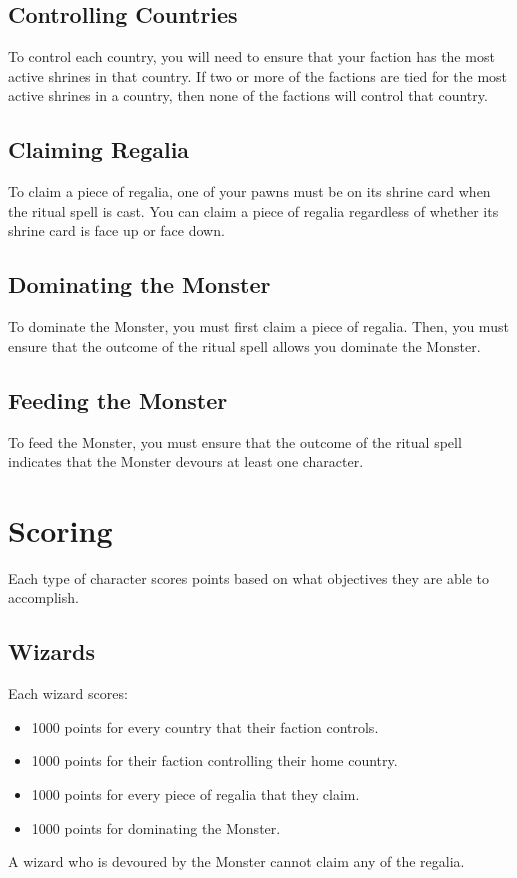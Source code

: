 \documentclass[10pt, parskip=half-, twoside]{scrartcl}
\begin{document}
\subsection*{Controlling Countries}
To control each country, you will need to ensure that your faction has the most active shrines in that country. If two or more of the factions are tied for the most active shrines in a country, then none of the factions will control that country.

\subsection*{Claiming Regalia}
To claim a piece of regalia, one of your pawns must be on its shrine card when the ritual spell is cast. You can claim a piece of regalia regardless of whether its shrine card is face up or face down.

\newpage

\subsection*{Dominating the Monster}
To dominate the Monster, you must first claim a piece of regalia. Then, you must ensure that the outcome of the ritual spell allows you dominate the Monster.

\subsection*{Feeding the Monster}
To feed the Monster, you must ensure that the outcome of the ritual spell indicates that the Monster devours at least one character.

\newpage

\section*{Scoring}
Each type of character scores points based on what objectives they are able to accomplish.

\subsection*{Wizards}
Each wizard scores:
\begin{itemize}[itemindent=*, leftmargin=*]
\item 1000 points for every country that their faction controls.
\item 1000 points for their faction controlling their home country.
\item 1000 points for every piece of regalia that they claim.
\item 1000 points for dominating the Monster.
\end{itemize}
A wizard who is devoured by the Monster cannot claim any of the regalia.
\end{document}
